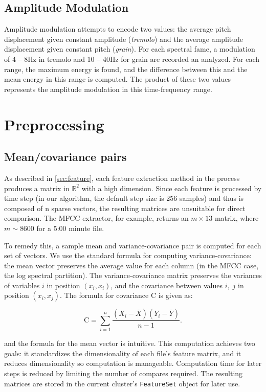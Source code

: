 \documentclass[12pt,twocolumn,titlepage]{article}
\begin{document}
\subsection{Amplitude Modulation}

Amplitude modulation attempts to encode two values: the average pitch displacement given constant amplitude (\emph{tremolo}) and the average amplitude displacement given constant pitch (\emph{grain}). \cite{Eronen} For each spectral fame, a modulation of 4 -- 8Hz in tremolo and 10 -- 40Hz for grain are recorded an analyzed. For  each range, the maximum energy is found, and the difference between this and the mean energy in this range is computed. \cite{yaafe} The product of these two values represents the amplitude modulation in this time-frequency range.


\section{Preprocessing}
\label{sec:preprocessing}


\subsection{Mean/covariance pairs}

As described in \ref{sec:feature}, each feature extraction method in the process produces a matrix in $\mathbb{R}^2$ with a high dimension. Since each feature is processed by time step (in our algorithm, the default step size is 256 samples) and thus is composed of n sparse vectors, the resulting matrices are unsuitable for direct comparison. The MFCC extractor, for example, returns an $m\times13$ matrix, where $m \sim 8600$ for a 5:00 minute file. 


To remedy this, a sample mean and variance-covariance pair is computed for each set of vectors. We use the standard formula for computing variance-covariance: the mean vector preserves the average value for each column (in the MFCC case, the log spectral partition). The variance-covariance matrix preserves the variances of variables $i$ in position $(x_i, x_i)$, and the covariance between values $i, \;j$ in position $(x_i, x_j)$. The formula for covariance $\mathrm{C}$ is given as:

\begin{equation}\label{}
\mathrm{C} = \sum_{i=1}^{n}{\frac{(X_i-\overline{X})(Y_i-\overline{Y})}{n-1}}.
\end{equation}


and the formula for the mean vector is intuitive. This computation achieves two goals: it standardizes the dimensionality of each file's feature matrix, and it reduces dimensionality so computation is manageable. Computation time for later steps is reduced by limiting the number of compares required. The resulting matrices are stored in the current cluster's \texttt{FeatureSet} object for later use.
\end{document}
